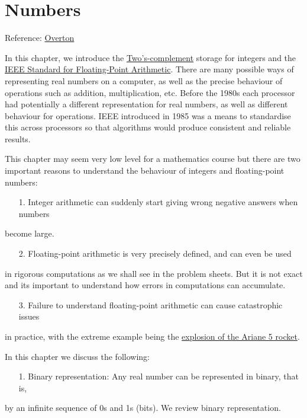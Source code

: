 \documentclass[12pt,a4paper]{article}
\begin{document}
\section{Numbers}
Reference: \href{https://cs.nyu.edu/~overton/book/}{Overton}

In this chapter, we introduce the \href{https://en.wikipedia.org/wiki/Two's_complement}{Two's-complement} storage for integers and the \href{https://en.wikipedia.org/wiki/IEEE_754}{IEEE Standard for Floating-Point Arithmetic}. There are many  possible ways of representing real numbers on a computer, as well as the precise behaviour of operations such as addition, multiplication, etc. Before the 1980s each processor had potentially a different representation for real numbers, as well as different behaviour for operations. IEEE introduced in 1985 was a means to standardise this across processors so that algorithms would produce consistent and reliable results.

This chapter may seem very low level for a mathematics course but there are two important reasons to understand the behaviour of integers and floating-point numbers:

\begin{itemize}
\item[1. ] Integer arithmetic can suddenly start giving wrong negative answers when numbers

\end{itemize}
become large.

\begin{itemize}
\item[2. ] Floating-point arithmetic is very precisely defined, and can even be used

\end{itemize}
in rigorous computations as we shall see in the problem sheets. But it is not exact and its important to understand how errors in computations can accumulate.

\begin{itemize}
\item[3. ] Failure to understand floating-point arithmetic can cause catastrophic issues

\end{itemize}
in practice, with the extreme example being the \href{https://youtu.be/N6PWATvLQCY?t=86}{explosion of the Ariane 5 rocket}.

In this chapter we discuss the following:

\begin{itemize}
\item[1. ] Binary representation: Any real number can be represented in binary, that is,

\end{itemize}
by an infinite sequence of 0s and 1s (bits). We review  binary representation.
\end{document}
